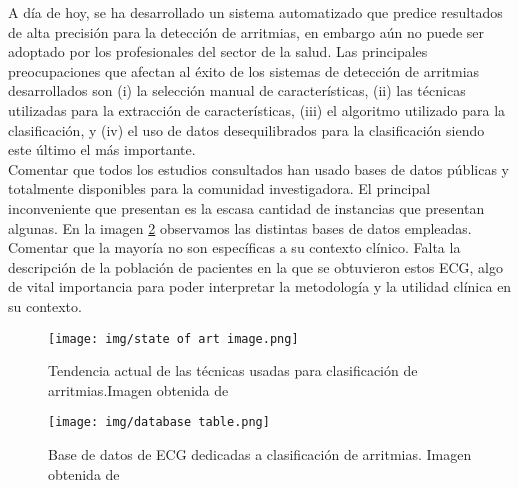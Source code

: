     A día de hoy, se ha desarrollado un sistema automatizado que predice resultados de alta precisión para la detección de arritmias, en embargo aún no puede ser adoptado por los profesionales del sector de la salud. Las principales preocupaciones que afectan al éxito de los sistemas de detección de arritmias desarrollados son (i) la selección manual de características, (ii) las técnicas utilizadas para la extracción de características, (iii) el algoritmo utilizado para la clasificación, y (iv) el uso de datos desequilibrados para la clasificación siendo este último el más importante. \\ 
    
    
    Comentar que todos los estudios consultados han usado bases de datos públicas y totalmente disponibles para la comunidad investigadora. El principal inconveniente que presentan es la escasa cantidad de instancias que presentan algunas. En la imagen \ref{fig:db ecg} observamos las distintas bases de datos empleadas. Comentar que la mayoría no son específicas a su contexto clínico. Falta la descripción de la población de pacientes en la que se obtuvieron estos ECG, algo de vital importancia para poder interpretar la metodología y la utilidad clínica en su contexto. 
    
    \begin{figure}[htpb]
        \centering
        \texttt{[image: img/state of art image.png]}
        \caption{Tendencia actual de las técnicas usadas para clasificación de arritmias.Imagen obtenida de \cite{khan2021arrhythmia}}
        \label{fig:trend state of art}
    \end{figure}
    
    \begin{figure}
        \centering
        \texttt{[image: img/database table.png]}
        \caption{Base de datos de ECG dedicadas a clasificación de arritmias. Imagen obtenida de \cite{khan2021arrhythmia}}
        \label{fig:db ecg}
    \end{figure}
    
    
    

    
\endinput